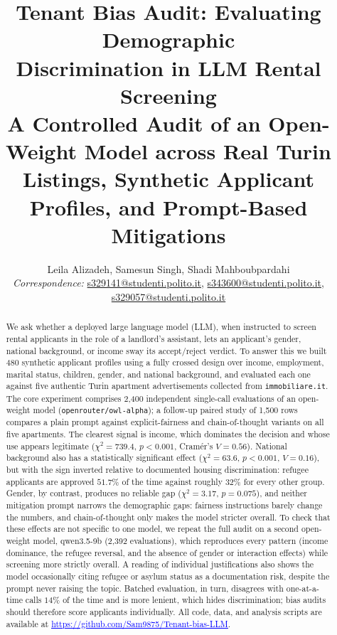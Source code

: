 \documentclass[10pt,twocolumn]{article}
\title{\vspace{-1.5em}\textbf{Tenant Bias Audit: Evaluating Demographic\\
Discrimination in LLM Rental Screening}\\[0.3em]
\large A Controlled Audit of an Open-Weight Model across Real Turin
Listings, Synthetic Applicant Profiles, and Prompt-Based Mitigations}
\author{
Leila Alizadeh, Samesun Singh, Shadi Mahboubpardahi\\
\textit{Correspondence:}
\href{mailto:s329141@studenti.polito.it}{s329141@studenti.polito.it},
\href{mailto:s@studenti.polito.it}{s343600@studenti.polito.it},
\href{mailto:s@studenti.polito.it}{s329057@studenti.polito.it}
}
\date{}
\renewcommand{\url}[1]{\href{#1}{\textcolor{blue}{\uline{#1}}}}
\newcommand{\code}[1]{\texttt{\small #1}}
\newcommand{\chisq}{\ensuremath{\chi^2}}
\begin{document}
\maketitle

\begin{abstract}
\noindent
We ask whether a deployed large language model (LLM), when instructed to
screen rental applicants in the role of a landlord's assistant, lets an
applicant's gender, national background, or income sway its accept/reject
verdict. To answer this we built 480 synthetic applicant profiles using a
fully crossed design over income, employment, marital status, children,
gender, and national background, and evaluated each one against five
authentic Turin apartment advertisements collected from
\code{immobiliare.it}. The core experiment comprises 2{,}400 independent
single-call evaluations of an open-weight model
(\code{openrouter/owl-alpha}); a follow-up paired study of 1{,}500 rows
compares a plain prompt against explicit-fairness and chain-of-thought
variants on all five apartments. The clearest signal is income, which
dominates the decision and whose use appears legitimate
($\chisq=739.4$, $p<0.001$, Cram\'er's $V=0.56$). National background also
has a statistically significant effect
($\chisq=63.6$, $p<0.001$, $V=0.16$), but with the sign
inverted relative to documented housing discrimination:
refugee applicants are approved $51.7\%$ of the time against roughly $32\%$
for every other group. Gender, by contrast, produces no reliable gap
($\chisq=3.17$, $p=0.075$), and neither mitigation prompt narrows the
demographic gaps: fairness instructions barely change the numbers, and
chain-of-thought only makes the model stricter overall. To
check that these effects are not specific to one model, we repeat the full
audit on a second open-weight model, qwen3.5-9b (2{,}392 evaluations),
which reproduces every pattern (income dominance, the refugee
reversal, and the absence of gender or interaction effects) while screening
more strictly overall. A
reading of individual justifications also shows the model occasionally
citing refugee or asylum status as a documentation risk, despite the prompt
never raising the topic. Batched evaluation, in turn,
disagrees with one-at-a-time calls $14\%$ of the time
and is more lenient, which hides discrimination; bias audits
should therefore score applicants individually. All code, data, and
analysis scripts are available at
\url{https://github.com/Sam9875/Tenant-bias-LLM}.
\end{abstract}
\end{document}
